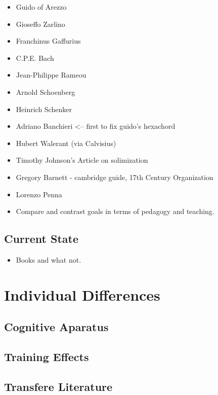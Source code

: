 \documentclass[]{book}
\providecommand{\tightlist}{%
  \setlength{\itemsep}{0pt}\setlength{\parskip}{0pt}}
\theoremstyle{definition}
\theoremstyle{definition}
\theoremstyle{definition}
\theoremstyle{remark}
\begin{document}
\begin{itemize}
\item
  Guido of Arezzo
\item
  Gioseffo Zarlino
\item
  Franchinus Gaffurius
\item
  C.P.E. Bach
\item
  Jean-Philippe Rameou
\item
  Arnold Schoenberg
\item
  Heinrich Schenker
\item
  Adriano Banchieri \textless{}-- first to fix guido's hexachord
\item
  Hubert Walerant (via Calvisius)
\item
  Timothy Johnson's Article on solimization
\item
  Gregory Barnett - cambridge guide, 17th Century Organization
\item
  Lorenzo Penna
\item
  Compare and contrast goals in terms of pedagogy and teaching.
\end{itemize}

\hypertarget{current-state}{%
\section{Current State}\label{current-state}}

\begin{itemize}
\tightlist
\item
  Books and what not.
\end{itemize}

\hypertarget{individual-differences}{%
\chapter{Individual Differences}\label{individual-differences}}

\hypertarget{cognitive-aparatus}{%
\section{Cognitive Aparatus}\label{cognitive-aparatus}}

\hypertarget{training-effects}{%
\section{Training Effects}\label{training-effects}}

\hypertarget{transfere-literature}{%
\section{Transfere Literature}\label{transfere-literature}}
\end{document}
